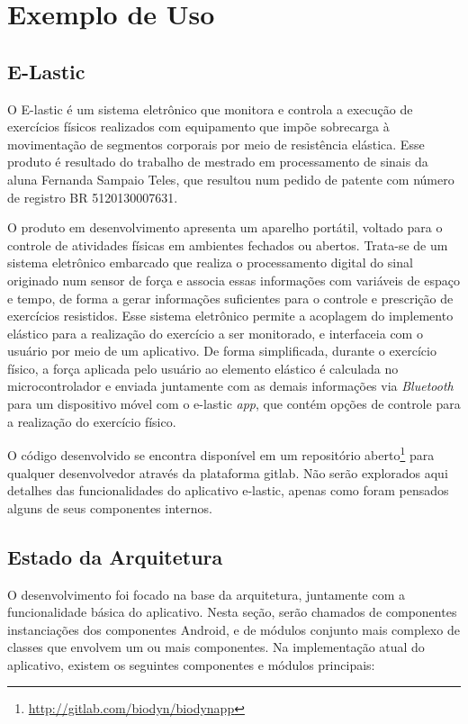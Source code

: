 \chapter{Exemplo de Uso}
\label{cap:elastic}

\section{E-Lastic}
O E-lastic é um sistema eletrônico que monitora e controla a execução de exercícios físicos realizados com equipamento que impõe sobrecarga à movimentação de segmentos corporais por meio de resistência elástica. Esse produto é resultado do trabalho de mestrado em processamento de sinais da aluna Fernanda Sampaio Teles, que resultou num pedido de patente com número de registro BR 5120130007631.

O produto em desenvolvimento apresenta um aparelho portátil, voltado para o controle de atividades físicas em ambientes fechados ou abertos. Trata-se de um sistema eletrônico embarcado que realiza o processamento digital do sinal originado num sensor de força e associa essas informações com variáveis de espaço e tempo, de forma a gerar informações suficientes para o controle e prescrição de exercícios resistidos. Esse sistema eletrônico permite a acoplagem do implemento elástico para a realização do exercício a ser monitorado, e interfaceia com o usuário por meio de um aplicativo. De forma simplificada, durante o exercício físico, a força aplicada pelo usuário ao elemento elástico é calculada no microcontrolador e enviada juntamente com as demais informações via \textit{Bluetooth} para um dispositivo móvel com o e-lastic \textit{app}, que contém opções de controle para a realização do exercício físico.

O código desenvolvido se encontra disponível em um repositório aberto\footnote{\url{http://gitlab.com/biodyn/biodynapp}} para qualquer desenvolvedor através da plataforma gitlab. Não serão explorados aqui detalhes das funcionalidades do aplicativo e-lastic, apenas como foram pensados alguns de seus componentes internos.

\section{Estado da Arquitetura}

O desenvolvimento foi focado na base da arquitetura, juntamente com a funcionalidade básica do aplicativo. Nesta seção, serão chamados de componentes instanciações dos componentes Android, e de módulos conjunto mais complexo de classes que envolvem um ou mais componentes. Na implementação atual do aplicativo, existem os seguintes componentes e módulos principais:

